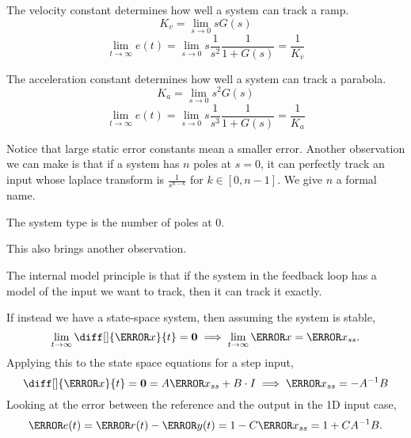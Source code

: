 \begin{definition}
  The velocity constant determines how well a system can track a ramp.
  \begin{equation}
	K_v = \lim_{s\to0}sG(s)
	\label{eqn:velocity-constant}
  \end{equation}
  \[
	\lim_{t\to\infty} e(t) = \lim_{s\to0} s \frac{1}{s^2} \frac{1}{1+G(s)} = \frac{1}{K_v}
  \]
  \label{defn:velocity-constant}
\end{definition}
\begin{definition}
  The acceleration constant determines how well a system can track a parabola.
  \begin{equation}
	K_a = \lim_{s\to0}s^2G(s)
	\label{eqn:acceleration-constant}
  \end{equation}
  \[
	\lim_{t\to\infty} e(t) = \lim_{s\to0} s \frac{1}{s^3} \frac{1}{1+G(s)} = \frac{1}{K_a}
  \]
  \label{defn:acceleration-constant}
\end{definition}
Notice that large static error constants mean a smaller error.
Another observation we can make is that if a system has $n$ poles at $s=0$, it can perfectly track an input whose laplace transform is $\frac{1}{s^{n-k}}$ for $k\in[0, n-1]$. We give $n$ a formal name.
\begin{definition}
  The system type is the number of poles at 0.
  \label{defn:system-type}
\end{definition}
This also brings another observation.
\begin{definition}
  The internal model principle is that if the system in the feedback loop has a model of the input we want to track, then it can track it exactly.
  \label{defn:interal-model}
\end{definition}
If instead we have a state-space system, then assuming the system is stable,
\[
  \lim_{t\to\infty}\diff[]{\V{x}}{t} = \bs{0} \implies \lim_{t\to\infty}\V{x} = \V{x}_{ss}.
\]
Applying this to the state space equations for a step input,
\begin{equation}
  \diff[]{\V{x}}{t} = \bs{0} = A\V{x}_{ss} + B\cdot I \implies \V{x}_{ss} = -A^{-1}B
  \label{eqn:ss-sse}
\end{equation}
Looking at the error between the reference and the output in the 1D input case,
\[
  \V{e}(t) = \V{r}(t) - \V{y}(t) = 1 - C\V{x}_{ss} = 1 + CA^{-1}B.
\]
